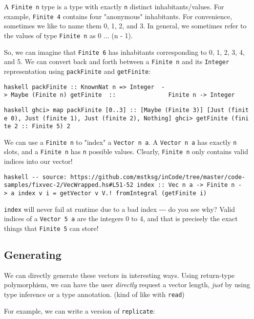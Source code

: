 \documentclass[]{article}
\begin{document}
A \texttt{Finite\ n} type is a type with exactly \texttt{n} distinct
inhabitants/values. For example, \texttt{Finite\ 4} contains four "anonymous"
inhabitants. For convenience, sometimes we like to name them 0, 1, 2, and 3. In
general, we sometimes refer to the values of type \texttt{Finite\ n} as 0 ... (n
- 1).

So, we can imagine that \texttt{Finite\ 6} has inhabitants corresponding to 0,
1, 2, 3, 4, and 5. We can convert back and forth between a \texttt{Finite\ n}
and its \texttt{Integer} representation using \texttt{packFinite} and
\texttt{getFinite}:

\texttt{haskell\ packFinite\ ::\ KnownNat\ n\ =\textgreater{}\ Integer\ \ -\textgreater{}\ Maybe\ (Finite\ n)\ getFinite\ \ ::\ \ \ \ \ \ \ \ \ \ \ \ \ \ \ Finite\ n\ -\textgreater{}\ Integer}

\texttt{haskell\ ghci\textgreater{}\ map\ packFinite\ {[}0..3{]}\ ::\ {[}Maybe\ (Finite\ 3){]}\ {[}Just\ (finite\ 0),\ Just\ (finite\ 1),\ Just\ (finite\ 2),\ Nothing{]}\ ghci\textgreater{}\ getFinite\ (finite\ 2\ ::\ Finite\ 5)\ 2}

We can use a \texttt{Finite\ n} to "index" a \texttt{Vector\ n\ a}. A
\texttt{Vector\ n\ a} has exactly \texttt{n} slots, and a \texttt{Finite\ n} has
\texttt{n} possible values. Clearly, \texttt{Finite\ n} only contains valid
indices into our vector!

\texttt{haskell\ -\/-\ source:\ https://github.com/mstksg/inCode/tree/master/code-samples/fixvec-2/VecWrapped.hs\#L51-52\ index\ ::\ Vec\ n\ a\ -\textgreater{}\ Finite\ n\ -\textgreater{}\ a\ index\ v\ i\ =\ getVector\ v\ V.!\ fromIntegral\ (getFinite\ i)}

\texttt{index} will never fail at runtime due to a bad index -\/-\/- do you see
why? Valid indices of a \texttt{Vector\ 5\ a} are the integers 0 to 4, and that
is precisely the exact things that \texttt{Finite\ 5} can store!

\subsection{Generating}

We can directly generate these vectors in interesting ways. Using return-type
polymorphism, we can have the user \emph{directly} request a vector length,
\emph{just} by using type inference or a type annotation. (kind of like with
\texttt{read})

For example, we can write a version of \texttt{replicate}:
\end{document}
